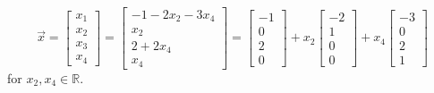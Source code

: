\documentclass[10pt,letter]{article}
\begin{document}
$$\vec{x}=\begin{bmatrix}x_1\\x_2\\x_3\\x_4\end{bmatrix} = \begin{bmatrix}-1-2x_2-3x_4\\x_2\\2+2x_4\\x_4\end{bmatrix} =\begin{bmatrix}-1\\0\\2\\0\end{bmatrix} +x_2\begin{bmatrix}-2\\1\\0\\0\end{bmatrix} +x_4\begin{bmatrix}-3\\0\\2\\1\end{bmatrix} $$ for $x_2,x_4\in\mathbb{R}$. 
\end{document}
